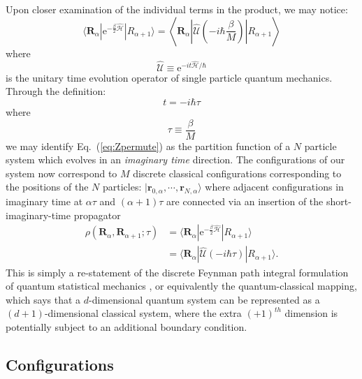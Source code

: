 \documentclass[prb,aps,amssym,nofootinbib,floatfix,notitlepage]{revtex4-1}
\renewcommand{\vec}[1]{\boldsymbol{#1}}
\newcommand{\e}[1]{\mathrm{e}^{#1}}
\renewcommand{\eqref}[1]{Eq.~(\ref{#1})}
\newcommand{\R}{\vec{R}}
\begin{document}
Upon closer examination of the individual terms in the product, we may notice:
%
\begin{equation}
    \langle \R_\alpha | \e{-\frac{\beta}{2}\hat{\mathcal{H}}} | R_{\alpha+1}
    \rangle = 
    \left \langle \R_\alpha \left | \hat{\mathcal{U}}\left(-i \hbar
    \frac{\beta}{M}\right) \right | R_{\alpha+1}
    \right \rangle 
\end{equation}
%
where 
%
\begin{equation}
    \hat{\mathcal{U}} \equiv \e{-{i t} \hat{\mathcal{H}}/\hbar}
\end{equation}
%
is the unitary time evolution operator of single particle quantum mechanics.
Through the definition:
%
\begin{equation}
t = - i \hbar \tau
\end{equation}
%
where 
%
\begin{equation}
    \tau \equiv \frac{\beta}{M}
\end{equation}
%
we may identify \eqref{eq:Zpermute} as the partition function of a $N$
particle system which evolves in an \emph{imaginary time} direction. The
configurations of our system now correspond to $M$ discrete classical configurations
corresponding to the positions of the $N$ particles:
$|\vec{r}_{0,\alpha},\cdots,\vec{r}_{N,\alpha}\rangle$ where adjacent configurations
in imaginary time at $\alpha \tau$ and $(\alpha+1)\tau$ are connected via an
insertion of the short-imaginary-time propagator 
\begin{align*}
    \rho(\R_\alpha,\R_{\alpha+1};\tau) 
    &= \langle \R_\alpha| \e{-\frac{\beta}{2}\hat{\mathcal{H}}} | R_{\alpha+1} \rangle 
     \\ 
     &= \langle \R_\alpha| \hat{\mathcal{U}}(-i \hbar \tau) | R_{\alpha+1} \rangle.
\end{align*}
This is simply a re-statement of the discrete Feynman path integral
formulation of quantum statistical mechanics \cite{feynman1965quantum}, or
equivalently the quantum-classical mapping, which says that a $d$-dimensional
quantum system can be represented as a $(d+1)$-dimensional classical system,
where the extra $(+1)^{th}$ dimension is potentially subject to an additional
boundary condition.

\subsection{Configurations}
\label{sec:configurations}
\end{document}
